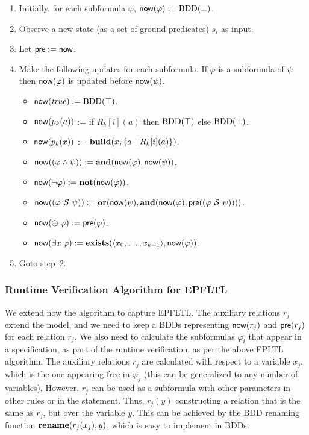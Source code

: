 \begin{enumerate}
\item Initially, for each subformula $\varphi$,
$\mathsf{now} ( \varphi ) := \mathrm{BDD}(\bot)$.
\item Observe a new state (as a set of ground predicates) $s_i$ as input. 
\item Let $\mathsf{pre} := \mathsf{now}$.
\item Make the following updates for each subformula. If $\varphi$ is
      a subformula of $\psi$ then $\mathsf{now} ( \varphi )$ is updated before 
      $\mathsf{now} ( \psi )$.
\begin{itemize}
  \item $\mathsf{now} ( \mathit{true} ) := \mathrm{BDD}(\top)$.
  \item $\mathsf{now} ( p_k ( a ) )$ := if $R_k [ i ] ( a )$ then
  $\mathrm{BDD}(\top)$ else $\mathrm{BDD}(\bot)$.
  \item $\mathsf{now} ( p_k ( x ) )$ :=
     $\mathbf{build} ( x ,  \{ a \ | \ R_k[i] ( a  ) \} )$.
  \item $\mathsf{now} ( ( \varphi \wedge \psi ) ) := 
  \mathbf{and} ( \mathsf{now} ( \varphi ) , \mathsf{now} ( \psi ))$.
  \item $\mathsf{now} ( \neg \varphi  ) := \mathbf{not} ( \mathsf{now} ( \varphi ))$.
  \item $\mathsf{now} ( ( \varphi\ {\cal S}\ \psi ) ) := \\ 
  \mathbf{or} ( \mathsf{now} ( \psi  ) , \mathbf{and} ( \mathsf{now} ( \varphi ) ,
      \mathsf{pre} ( ( \varphi \ {\cal S} \ \psi ))))$.
  \item $\mathsf{now} ( \ominus \; \varphi ) := \mathsf{pre} ( \varphi )$.
  \item $\mathsf{now} ( \exists x \; \varphi ) := 
  \mathbf{exists} (\langle x_0,\ldots,x_{k-1} \rangle, \mathsf{now} ( \varphi ))$.
\end{itemize}
\item Goto step~2.
\end{enumerate}

\subsubsection{Runtime Verification Algorithm for EPFLTL}

We extend now the algorithm to capture EPFLTL.
The auxiliary relations $r_j$ extend the model, and we need to keep 
a BDDs representing $\mathsf{now} ( r_j )$ and
$\mathsf{pre} (r_j)$ for each relation $r_j$. We also need to calculate the subformulas $\varphi_i$ that appear in
a specification, as part of the runtime verification,
as per the above FPLTL algorithm. The auxiliary relations $r_j$ are calculated with respect to
a variable $x_j$, which is the one appearing
free in $\varphi_j$ (this can be generalized to any number of variables). However, $r_j$ can be used
as a subformula with other parameters in other rules or in the statement. Thus,
$r_j ( y )$ constructing a relation
that is the same as $r_j$, but over the variable $y$. This can be achieved by the BDD renaming function $\mathbf{rename} ( r_j (x_j ) , y)$, which is easy to implement in BDDs.


